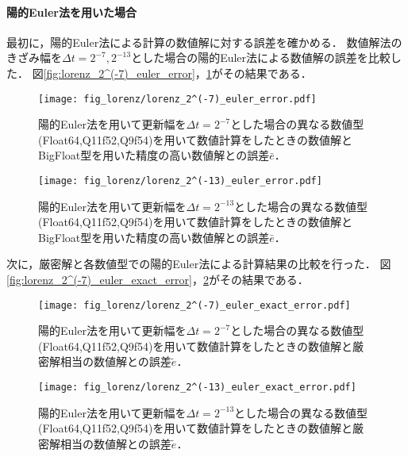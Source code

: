 \paragraph*{陽的Euler法を用いた場合}
最初に，陽的Euler法による計算の数値解に対する誤差を確かめる．
数値解法のきざみ幅を$\Delta t = 2^{-7},2^{-13}$とした場合の陽的Euler法による数値解の誤差を比較した．
図\ref{fig:lorenz_2^(-7)_euler_error}，\ref{fig:lorenz_2^(-13)_euler_error}がその結果である．
\begin{figure}[H]
    \centering
    \begin{minipage}[b]{0.48\columnwidth}
        \centering
        \texttt{[image: fig\_lorenz/lorenz\_2^(-7)\_euler\_error.pdf]}
        \caption{陽的Euler法を用いて更新幅を$\Delta t = 2^{-7}$とした場合の異なる数値型(Float64,Q11f52,Q9f54)を用いて数値計算をしたときの数値解とBigFloat型を用いた精度の高い数値解との誤差$\bar{e}$．}
        \label{fig:lorenz_2^(-7)_euler_error}
    \end{minipage}
    \hspace{0.01\columnwidth}
    \begin{minipage}[b]{0.48\columnwidth}
        \centering
        \texttt{[image: fig\_lorenz/lorenz\_2^(-13)\_euler\_error.pdf]}
        \caption{陽的Euler法を用いて更新幅を$\Delta t =  2^{-13}$とした場合の異なる数値型(Float64,Q11f52,Q9f54)を用いて数値計算をしたときの数値解とBigFloat型を用いた精度の高い数値解との誤差$\bar{e}$．}
        \label{fig:lorenz_2^(-13)_euler_error}
    \end{minipage}
\end{figure}
次に，厳密解と各数値型での陽的Euler法による計算結果の比較を行った．
図\ref{fig:lorenz_2^(-7)_euler_exact_error}，\ref{fig:lorenz_2^(-13)_euler_exact_error}がその結果である．
\begin{figure}[H]
    \centering
    \begin{minipage}[b]{0.48\columnwidth}
        \centering
        \texttt{[image: fig\_lorenz/lorenz\_2^(-7)\_euler\_exact\_error.pdf]}
        \caption{陽的Euler法を用いて更新幅を$\Delta t = 2^{-7}$とした場合の異なる数値型(Float64,Q11f52,Q9f54)を用いて数値計算をしたときの数値解と厳密解相当の数値解との誤差$\tilde{e}$．}
        \label{fig:lorenz_2^(-7)_euler_exact_error}
    \end{minipage}
    \hspace{0.01\columnwidth}
    \begin{minipage}[b]{0.48\columnwidth}
        \centering
        \texttt{[image: fig\_lorenz/lorenz\_2^(-13)\_euler\_exact\_error.pdf]}
        \caption{陽的Euler法を用いて更新幅を$\Delta t =  2^{-13}$とした場合の異なる数値型(Float64,Q11f52,Q9f54)を用いて数値計算をしたときの数値解と厳密解相当の数値解との誤差$\tilde{e}$．}
        \label{fig:lorenz_2^(-13)_euler_exact_error}
    \end{minipage}
\end{figure}

